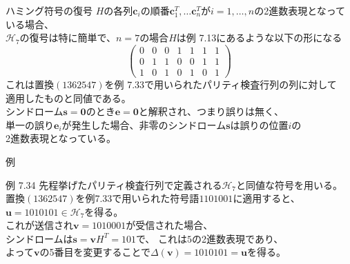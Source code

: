 \documentclass[dvipdfmx,10pt,jsarticle]{beamer}
\newcommand{\code}[1]{\mathcal{#1}}
\renewcommand{\vec}[1]{\mathbf{#1}}
\begin{document}
  \begin{frame}{ハミング符号の復号}
    $H$の各列$\vec{c}_i$の順番$\vec{c}_1^T, \ldots \vec{c}_n^T$が$i = 1,\ldots,n$の2進数表現となっている場合、\\
    $\code{H}_7$の復号は特に簡単で、$n = 7$の場合$H$は例 7.13にあるような以下の形になる
    \[ \begin{pmatrix}
        0 & 0 & 0 & 1 & 1 & 1 & 1 \\
        0 & 1 & 1 & 0 & 0 & 1 & 1 \\
        1 & 0 & 1 & 0 & 1 & 0 & 1
    \end{pmatrix} \]
    これは置換$(1362547)$を例 7.33で用いられたパリティ検査行列の列に対して\\
    適用したものと同値である。\\
    シンドローム$\vec{s} = \vec{0}$のとき$\vec{e} = \vec{0}$と解釈され、つまり誤りは無く、 \\
    単一の誤り$\vec{e}_i$が発生した場合、非零のシンドローム$\vec{s}$は誤りの位置$i$の\\
    2進数表現となっている。
  \end{frame}
  \begin{frame}{例}
    \begin{block}{例 7.34}
      先程挙げたパリティ検査行列で定義される$\code{H}_7$と同値な符号を用いる。\\
      置換$(1362547)$を例7.33で用いられた符号語$1101001$に適用すると、$\vec{u} = 1010101 \in \code{H}_7$を得る。 \\
      これが送信され$\vec{v} = 1010001$が受信された場合、\\
      シンドロームは$\vec{s} = \vec{v} H^T = 101$で、 これは$5$の2進数表現であり、\\
      よって$\vec{v}$の5番目を変更することで$\Delta(\vec{v}) = 1010101 = \vec{u}$を得る。
    \end{block}
  \end{frame}
  
\end{document}
